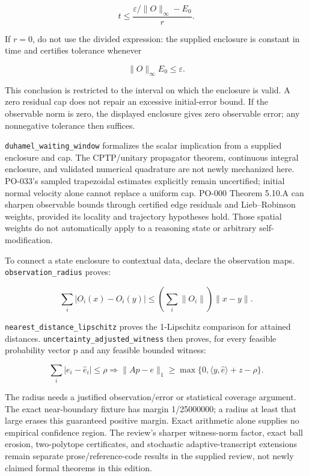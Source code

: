 \documentclass[
  10pt,
]{article}
\begin{document}
\protect\hypertarget{math-E0026-0034}{}{\[
t\le\frac{\varepsilon/\lVert O\rVert_\infty-E_0}{r}.
\]}

If \protect\hypertarget{math-E0032-0035}{}{\(r=0\)}, do not use the divided expression: the supplied enclosure is constant in time and certifies tolerance whenever

\protect\hypertarget{math-E0033-0036}{}{\[
\lVert O\rVert_\infty E_0\le\varepsilon.
\]}

This conclusion is restricted to the interval on which the enclosure is valid. A zero residual cap does not repair an excessive initial-error bound. If the observable norm is zero, the displayed enclosure gives zero observable error; any nonnegative tolerance then suffices.

\texttt{duhamel\_waiting\_window} formalizes the scalar implication from a supplied enclosure and cap. The CPTP/unitary propagator theorem, continuous integral enclosure, and validated numerical quadrature are not newly mechanized here. PO-033's sampled trapezoidal estimates explicitly remain uncertified; initial normal velocity alone cannot replace a uniform cap. PO-000 Theorem 5.10.A can sharpen observable bounds through certified edge residuals and Lieb--Robinson weights, provided its locality and trajectory hypotheses hold. Those spatial weights do not automatically apply to a reasoning state or arbitrary self-modification.

To connect a state enclosure to contextual data, declare the observation maps. \texttt{observation\_radius} proves:

\protect\hypertarget{math-E0027-0037}{}{\[
\sum_i|O_i(x)-O_i(y)|\le
\left(\sum_i\lVert O_i\rVert\right)\lVert x-y\rVert.
\]}

\texttt{nearest\_distance\_lipschitz} proves the 1-Lipschitz comparison for attained distances. \texttt{uncertainty\_adjusted\_witness} then proves, for every feasible probability vector p and any feasible bounded witness:

\protect\hypertarget{math-E0028-0038}{}{\[
\sum_i|e_i-\widehat e_i|\le\rho
\Longrightarrow
\lVert Ap-e\rVert_1\ge
\max\{0,\langle y,\widehat e\rangle+z-\rho\}.
\]}

The radius needs a justified observation/error or statistical coverage argument. The exact near-boundary fixture has margin 1/25000000; a radius at least that large erases this guaranteed positive margin. Exact arithmetic alone supplies no empirical confidence region. The review's sharper witness-norm factor, exact ball erosion, two-polytope certificates, and stochastic adaptive-transcript extensions remain separate prose/reference-code results in the supplied review, not newly claimed formal theorems in this edition.
\end{document}
